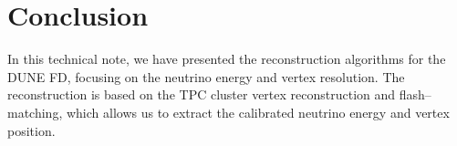 \section{Conclusion}\label{sec:CONCLUSION}
In this technical note, we have presented the reconstruction algorithms for the \ac{DUNE} \ac{FD}, focusing on the neutrino energy and vertex resolution. The reconstruction is based on the TPC cluster vertex reconstruction and flash--matching, which allows us to extract the calibrated neutrino energy and vertex position.


